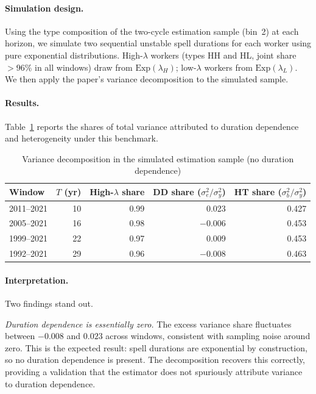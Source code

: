 \documentclass[12pt,a4paper]{article}
\begin{document}
\paragraph{Simulation design.} Using the type composition of the two-cycle estimation
sample (bin~2) at each horizon, we simulate two sequential unstable spell durations for
each worker using pure exponential distributions. High-$\lambda$ workers (types HH and
HL, joint share $> 96\%$ in all windows) draw from $\text{Exp}(\lambda_H)$; low-$\lambda$
workers from $\text{Exp}(\lambda_L)$. We then apply the paper's variance decomposition to
the simulated sample.

\paragraph{Results.} Table~\ref{tab:vd_sim} reports the shares of total variance
attributed to duration dependence and heterogeneity under this benchmark.

\begin{table}[h!]
\centering
\caption{Variance decomposition in the simulated estimation sample (no duration dependence)}
\label{tab:vd_sim}
\begin{tabular}{lrrrr}
\toprule
Window & $T$ (yr) & High-$\lambda$ share & DD share ($\sigma_e^2/\sigma_y^2$) & HT share ($\sigma_b^2/\sigma_y^2$)\\
\midrule
2011--2021 & 10 & 0.99 & 0.023 & 0.427\\
2005--2021 & 16 & 0.98 & $-$0.006 & 0.453\\
1999--2021 & 22 & 0.97 & 0.009 & 0.453\\
1992--2021 & 29 & 0.96 & $-$0.008 & 0.463\\
\bottomrule
\end{tabular}
\end{table}

\paragraph{Interpretation.} Two findings stand out.

\emph{Duration dependence is essentially zero.} The excess variance share fluctuates
between $-0.008$ and $0.023$ across windows, consistent with sampling noise around
zero. This is the expected result: spell durations are exponential by construction, so
no duration dependence is present. The decomposition recovers this correctly, providing
a validation that the estimator does not spuriously attribute variance to duration
dependence.
\end{document}

